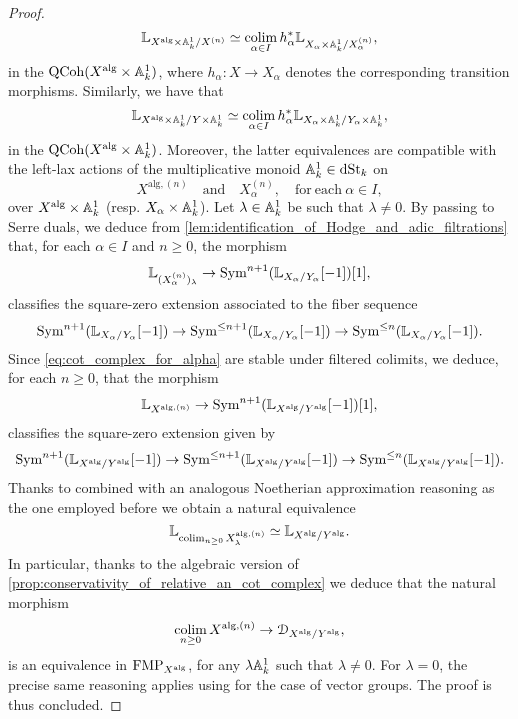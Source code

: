 \documentclass[10pt,a4paper,reqno]{amsart} %
\theoremstyle{plain}
\theoremstyle{definition}
\theoremstyle{remark}
\numberwithin{equation}{section}
\begin{document}
\begin{proof}
        \[
            \mathbb L_{X^\mathrm{alg} \times \mathbb A^1_k/ X^{(n)}} \simeq \operatorname*{colim}_{\alpha \in I} h_\alpha^* \mathbb L_{X_\alpha \times \mathbb A^1_k/ X^{(n)}_\alpha} ,
        \]
    in the \infcat $\mathrm{QCoh}(X^\mathrm{alg} \times \mathbb A^1_k)$, where $h_\alpha \colon X \to X_\alpha$ denotes the corresponding transition morphisms. Similarly, we have that
        \[
            \mathbb L_{X^\mathrm{alg} \times \mathbb A^1_k/ Y \times \mathbb A^1_k} \simeq \operatorname*{colim}_{\alpha \in I} h_\alpha^* \mathbb L_{X_\alpha \times \mathbb A^1_k / Y_\alpha \times \mathbb A^1_k} ,
        \]
    in the \infcat $\mathrm{QCoh}(X^\mathrm{alg} \times \mathbb A^1_k)$. Moreover, the latter equivalences are compatible with the left-lax actions of the multiplicative monoid $\mathbb A^1_k \in \mathrm{dSt}_k$
    on
        \[
            X^{\mathrm{alg}, (n)} \quad \mathrm{and} \quad X^{(n)}_\alpha, \quad \mathrm{for \ each} \ \alpha \in I,  
        \]
    over $X^\mathrm{alg} \times \mathbb A^1_k$ (resp. $X_\alpha \times \mathbb A^1_k$). Let $\lambda \in \mathbb A^1_k$ be such that $\lambda \neq 0$.
    By passing to Serre duals, we deduce from \cref{lem:identification_of_Hodge_and_adic_filtrations}
    that, for each $\alpha \in I$ and $n \ge 0$, the morphism
        \begin{equation} \label{eq:cot_complex_for_alpha}
            \mathbb L_{ (X_\alpha^{(n)})_\lambda} \to \operatorname{Sym}^{n+1}(\mathbb L_{X_\alpha / Y_\alpha}[-1])[1],
        \end{equation}
    classifies the square-zero extension associated to the fiber sequence
        \[
            \operatorname{Sym}^{n+1}(\mathbb L_{X_\alpha/ Y_\alpha}[-1]) \to \operatorname{Sym}^{\le n+1} (\mathbb L_{X_\alpha/ Y_\alpha}[-1]) \to \operatorname{Sym}^{\le n} ( \mathbb L_{X_\alpha/ Y_\alpha}[-1]).
        \]
    Since \eqref{eq:cot_complex_for_alpha} are stable under filtered colimits, we deduce, for each $n \ge 0$, that the morphism
        \[
            \mathbb L_{X^{\mathrm{alg}, (n)}} \to \operatorname{Sym}^{n+1}(\mathbb L_{X^\mathrm{alg}/ Y^\mathrm{alg}}[-1])[1],
        \]
    classifies the square-zero extension given by
        \[
            \operatorname{Sym}^{n+1}(\mathbb L_{X^\mathrm{alg}/ Y^\mathrm{alg}}[-1]) \to \operatorname{Sym}^{\le n+1}(\mathbb L_{X^\mathrm{alg}/ Y^\mathrm{alg}}[-1]) \to \operatorname{Sym}^{\le n}(\mathbb L_{X^\mathrm{alg}/ Y^\mathrm{alg}} [-1]).
        \]
    Thanks to \cite[\S 9.5.5.2]{Gaitsgory_Study_II} combined with an analogous Noetherian approximation reasoning as the one employed
    before we obtain a natural equivalence
        \[
            \mathbb L_{\operatorname*{colim}_{n \ge 0}X^{\mathrm{alg}, (n)}_\lambda} \simeq \mathbb L_{X^\mathrm{alg}/ Y^\mathrm{alg}}.
        \]
    In particular, thanks to the algebraic version of \cref{prop:conservativity_of_relative_an_cot_complex} we deduce that the natural morphism
        \[
            \operatorname*{colim}_{n \ge 0} X^{\mathrm{alg}, (n)}  \to \mathcal D_{X^\mathrm{alg}/ Y^\mathrm{alg}}, 
        \]
    is an equivalence in $\mathrm{FMP}_{X ^\mathrm{alg}}$, for any $\lambda \mathbb A^1_k$ such that $\lambda \neq 0$. For $\lambda = 0$, the
    precise same reasoning applies using \cite[\S 9, Theorem 5.5.4]{Gaitsgory_Study_II} for the case of vector groups. The proof is thus concluded.
\end{proof}
\end{document}
